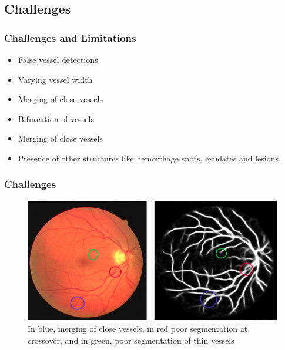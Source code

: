 \documentclass{beamer}
\begin{document}
	\subsection{Challenges}
	\begin{frame}
		\frametitle{Challenges and Limitations}
		\begin{block}{}
			\begin{itemize}
				\item False vessel detections
				\item Varying vessel width
				\item Merging of close vessels
				\item Bifurcation of vessels
				\item Merging of close vessels
				\item Presence of other structures like hemorrhage spots, exudates and lesions.
			\end{itemize}
	\end{block}
	\end{frame}
	
		\begin{frame}
			\frametitle{Challenges}
				\begin{figure}
					\includegraphics[width=1.0\linewidth]{Images/problem1.png}%
					\caption{In blue, merging of close vessels, in red poor segmentation at crossover, and in green, poor segmentation of thin vessels}
				\end{figure}
		\end{frame}


\end{document}
